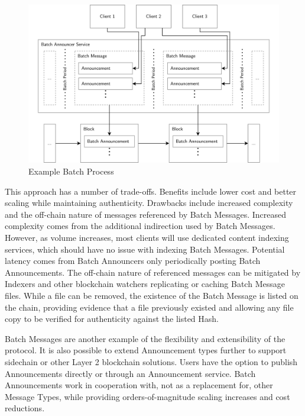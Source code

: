 \documentclass[12pt,letterpaper]{article}
\begin{document}
\begin{appendices}
	\begin{figure}
		\includegraphics[width=\linewidth]{figures/Example Batch Process.png}
		\caption{Example Batch Process}
		\label{fig:10}
	\end{figure}

	This approach has a number of trade-offs. Benefits include lower cost
	and better scaling while maintaining authenticity. Drawbacks include
	increased complexity and the off-chain nature of messages referenced by
	Batch Messages. Increased complexity comes from the additional
	indirection used by Batch Messages. However, as volume increases, most
	clients will use dedicated content indexing services, which should have
	no issue with indexing Batch Messages. Potential latency comes from
	Batch Announcers only periodically posting Batch Announcements. The
	off-chain nature of referenced messages can be mitigated by Indexers and
	other blockchain watchers replicating or caching Batch Message files.
	While a file can be removed, the existence of the Batch Message is
	listed on the chain, providing evidence that a file previously existed
	and allowing any file copy to be verified for authenticity against the
	listed Hash.

	Batch Messages are another example of the flexibility and extensibility
	of the protocol. It is also possible to extend Announcement types
	further to support sidechain or other Layer 2 blockchain solutions.
	Users have the option to publish Announcements directly or through an
	Announcement service. Batch Announcements work in cooperation with, not
	as a replacement for, other Message Types, while providing
	orders-of-magnitude scaling increases and cost reductions.

\end{appendices}
\end{document}
